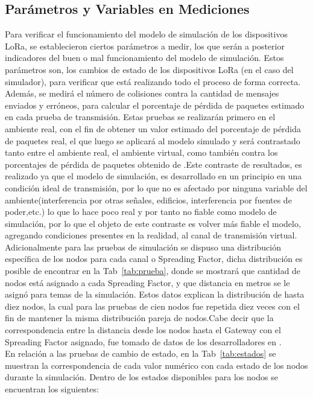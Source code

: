 \begin{justify}
\section{Parámetros y Variables en Mediciones}
Para verificar el funcionamiento del modelo de simulación de los dispositivos LoRa, se establecieron ciertos parámetros a medir, los que serán a posterior indicadores del buen o mal funcionamiento del modelo de simulación. Estos parámetros son, los cambios de estado de los dispositivos LoRa (en el caso del simulador), para verificar que está realizando todo el proceso de forma correcta. Además, se medirá el número de colisiones contra la cantidad de mensajes enviados y erróneos, para calcular el porcentaje de pérdida de paquetes estimado en cada prueba de transmisión. Estas pruebas se realizarán primero en el ambiente real, con el fin de obtener un valor estimado del porcentaje de pérdida de paquetes real, el que luego se aplicará al modelo simulado y será contrastado tanto entre el ambiente real, el ambiente virtual, como también contra los porcentajes de pérdida de paquetes obtenido de \cite{Juha}.Este contraste de resultados, es realizado ya que el modelo de simulación, es desarrollado en un principio en una condición ideal de transmisión, por lo que no es afectado por ninguna variable del ambiente(interferencia por otras señales, edificios, interferencia por fuentes de poder,etc.) lo que lo hace poco real y por tanto no fiable como modelo de simulación, por lo que el objeto de este contraste es volver más fiable el modelo, agregando condiciones presentes en la realidad, al canal de transmisión virtual.\\
Adicionalmente para las pruebas de simulación se dispuso una distribución específica de los nodos para cada canal o Spreading Factor, dicha distribución es posible de encontrar en la Tab~\ref{tab:prueba}, donde se mostrará que cantidad de nodos está asignado a cada Spreading Factor, y que distancia en metros se le asignó para temas de la simulación. Estos datos explican la distribución de hasta diez nodos, la cual para las pruebas de cien nodos fue repetida diez veces con el fin de mantener la misma distribución pareja de nodos.Cabe decir que la correspondencia entre la distancia desde los nodos hasta el Gateway con el Spreading Factor asignado, fue tomado de datos de los desarrolladores en \cite{orange}.\\
En relación a las pruebas de cambio de estado, en la Tab~\ref{tab:estados} se muestran la correspondencia de cada valor numérico con cada estado de los nodos durante la simulación. Dentro de los estados disponibles para los nodos se encuentran los siguientes:

\end{justify}
